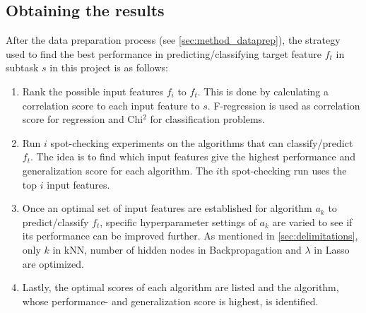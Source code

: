 	\subsection{Obtaining the results}
			After the data preparation process (see \ref{sec:method_dataprep}), the strategy used to find the best performance in predicting/classifying target feature $f_t$ in subtask $s$ in this project is as follows:
		\begin{enumerate}
			\item Rank the possible input features $f_i$ to $f_t$. This is done by calculating a correlation score to each input feature to $s$. F-regression is used as correlation score for regression and Chi$^2$ for classification problems.
			\item Run $i$ spot-checking experiments on the algorithms that can classify/predict $f_t$. The idea is to find which input features give the highest performance and generalization score for each algorithm. The $i$th spot-checking run uses the top $i$ input features.
			\item Once an optimal set of input features are established for algorithm $a_k$ to predict/classify $f_t$, specific hyperparameter settings of $a_k$ are varied to see if its performance can be improved further. As mentioned in \ref{sec:delimitations}, only $k$ in kNN, number of hidden nodes in Backpropagation and $\lambda$ in Lasso are optimized.
			\item Lastly, the optimal scores of each algorithm are listed and the algorithm, whose performance- and generalization score is highest, is identified.
		\end{enumerate}
		


